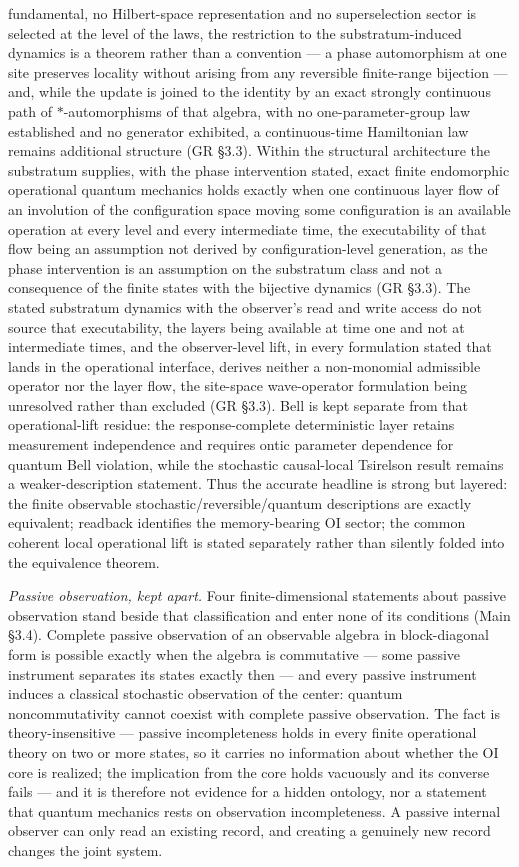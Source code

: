 \documentclass[
]{article}
\begin{document}
fundamental, no Hilbert-space representation and no superselection
sector is selected at the level of the laws, the restriction to the
substratum-induced dynamics is a theorem rather than a convention --- a
phase automorphism at one site preserves locality without arising from
any reversible finite-range bijection --- and, while the update is
joined to the identity by an exact strongly continuous path of
\(*\)-automorphisms of that algebra, with no one-parameter-group law
established and no generator exhibited, a continuous-time Hamiltonian
law remains additional structure (GR §3.3). Within the structural
architecture the substratum supplies, with the phase intervention
stated, exact finite endomorphic operational quantum mechanics holds
exactly when one continuous layer flow of an involution of the
configuration space moving some configuration is an available operation
at every level and every intermediate time, the executability of that
flow being an assumption not derived by configuration-level generation,
as the phase intervention is an assumption on the substratum class and
not a consequence of the finite states with the bijective dynamics (GR
§3.3). The stated substratum dynamics with the observer's read and write
access do not source that executability, the layers being available at
time one and not at intermediate times, and the observer-level lift, in
every formulation stated that lands in the operational interface,
derives neither a non-monomial admissible operator nor the layer flow,
the site-space wave-operator formulation being unresolved rather than
excluded (GR §3.3). Bell is kept separate from that operational-lift
residue: the response-complete deterministic layer retains measurement
independence and requires ontic parameter dependence for quantum Bell
violation, while the stochastic causal-local Tsirelson result remains a
weaker-description statement. Thus the accurate headline is strong but
layered: the finite observable stochastic/reversible/quantum
descriptions are exactly equivalent; readback identifies the
memory-bearing OI sector; the common coherent local operational lift is
stated separately rather than silently folded into the equivalence
theorem.

\emph{Passive observation, kept apart.} Four finite-dimensional
statements about passive observation stand beside that classification
and enter none of its conditions (Main §3.4). Complete passive
observation of an observable algebra in block-diagonal form is possible
exactly when the algebra is commutative --- some passive instrument
separates its states exactly then --- and every passive instrument
induces a classical stochastic observation of the center: quantum
noncommutativity cannot coexist with complete passive observation. The
fact is theory-insensitive --- passive incompleteness holds in every
finite operational theory on two or more states, so it carries no
information about whether the OI core is realized; the implication from
the core holds vacuously and its converse fails --- and it is therefore
not evidence for a hidden ontology, nor a statement that quantum
mechanics rests on observation incompleteness. A passive internal
observer can only read an existing record, and creating a genuinely new
record changes the joint system.
\end{document}
